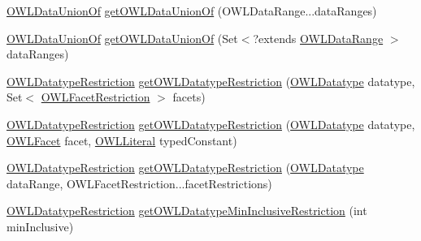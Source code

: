 \begin{DoxyCompactItemize}
\item 
\hyperlink{interfaceorg_1_1semanticweb_1_1owlapi_1_1model_1_1_o_w_l_data_union_of}{O\-W\-L\-Data\-Union\-Of} \hyperlink{classuk_1_1ac_1_1manchester_1_1cs_1_1owl_1_1owlapi_1_1_o_w_l_data_factory_impl_af35ceefb75d68e21890dbd5bde5b733f}{get\-O\-W\-L\-Data\-Union\-Of} (O\-W\-L\-Data\-Range...\-data\-Ranges)
\item 
\hyperlink{interfaceorg_1_1semanticweb_1_1owlapi_1_1model_1_1_o_w_l_data_union_of}{O\-W\-L\-Data\-Union\-Of} \hyperlink{classuk_1_1ac_1_1manchester_1_1cs_1_1owl_1_1owlapi_1_1_o_w_l_data_factory_impl_ab22d30ee035e5a3d128cd2ac31af3cf1}{get\-O\-W\-L\-Data\-Union\-Of} (Set$<$?extends \hyperlink{interfaceorg_1_1semanticweb_1_1owlapi_1_1model_1_1_o_w_l_data_range}{O\-W\-L\-Data\-Range} $>$ data\-Ranges)
\item 
\hyperlink{interfaceorg_1_1semanticweb_1_1owlapi_1_1model_1_1_o_w_l_datatype_restriction}{O\-W\-L\-Datatype\-Restriction} \hyperlink{classuk_1_1ac_1_1manchester_1_1cs_1_1owl_1_1owlapi_1_1_o_w_l_data_factory_impl_ae13d4f1ad260842bb3482219702101f7}{get\-O\-W\-L\-Datatype\-Restriction} (\hyperlink{interfaceorg_1_1semanticweb_1_1owlapi_1_1model_1_1_o_w_l_datatype}{O\-W\-L\-Datatype} datatype, Set$<$ \hyperlink{interfaceorg_1_1semanticweb_1_1owlapi_1_1model_1_1_o_w_l_facet_restriction}{O\-W\-L\-Facet\-Restriction} $>$ facets)
\item 
\hyperlink{interfaceorg_1_1semanticweb_1_1owlapi_1_1model_1_1_o_w_l_datatype_restriction}{O\-W\-L\-Datatype\-Restriction} \hyperlink{classuk_1_1ac_1_1manchester_1_1cs_1_1owl_1_1owlapi_1_1_o_w_l_data_factory_impl_a7b3da5bb618f954aca60ebb98c0dbe55}{get\-O\-W\-L\-Datatype\-Restriction} (\hyperlink{interfaceorg_1_1semanticweb_1_1owlapi_1_1model_1_1_o_w_l_datatype}{O\-W\-L\-Datatype} datatype, \hyperlink{enumorg_1_1semanticweb_1_1owlapi_1_1vocab_1_1_o_w_l_facet}{O\-W\-L\-Facet} facet, \hyperlink{interfaceorg_1_1semanticweb_1_1owlapi_1_1model_1_1_o_w_l_literal}{O\-W\-L\-Literal} typed\-Constant)
\item 
\hyperlink{interfaceorg_1_1semanticweb_1_1owlapi_1_1model_1_1_o_w_l_datatype_restriction}{O\-W\-L\-Datatype\-Restriction} \hyperlink{classuk_1_1ac_1_1manchester_1_1cs_1_1owl_1_1owlapi_1_1_o_w_l_data_factory_impl_a7f01a4e141d923a02c6960e082604cb0}{get\-O\-W\-L\-Datatype\-Restriction} (\hyperlink{interfaceorg_1_1semanticweb_1_1owlapi_1_1model_1_1_o_w_l_datatype}{O\-W\-L\-Datatype} data\-Range, O\-W\-L\-Facet\-Restriction...\-facet\-Restrictions)
\item 
\hyperlink{interfaceorg_1_1semanticweb_1_1owlapi_1_1model_1_1_o_w_l_datatype_restriction}{O\-W\-L\-Datatype\-Restriction} \hyperlink{classuk_1_1ac_1_1manchester_1_1cs_1_1owl_1_1owlapi_1_1_o_w_l_data_factory_impl_a29ad9f0a52c732366fd3928bc0de6612}{get\-O\-W\-L\-Datatype\-Min\-Inclusive\-Restriction} (int min\-Inclusive)

\end{DoxyCompactItemize}
